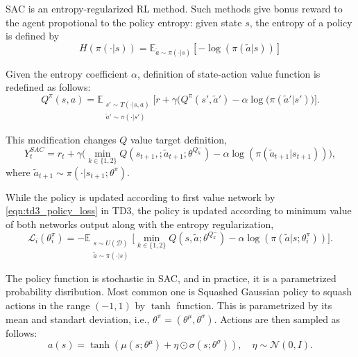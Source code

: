 \documentclass[a4paper, 12pt]{article} %
\begin{document}
SAC is an entropy-regularized RL method. Such methods give bonus reward to the agent propotional to the policy entropy: given state $s$, the entropy of a policy is defined by
\begin{equation}
\label{eqn:policy_entropy}
H(\pi(\cdot|s)) = \mathbb{E}_{\widetilde{a}\sim\pi(\cdot|s)}[-\log(\pi(\widetilde{a}|s))]
\end{equation}

Given the entropy coefficient $\alpha$, definition of state-action value function is redefined as follows: 
\begin{equation}
\label{eqn:q_dfn_entreg}
Q^{\pi}(s,a) = \mathbb{E}_{\substack{s'\sim T(\cdot|s,a)\\\widetilde{a}'\sim \pi(\cdot|s')} } \Big[r + \gamma \Big(Q^{\pi}(s',\widetilde{a}') -\alpha\log(\pi(\widetilde{a}'|s') \Big) \Big]. %
\end{equation}

This modification changes $Q$ value target definition,
\begin{equation}
\label{eqn:q_target_sac}
Y_t^{SAC} = r_t + \gamma \Big(\min_{k\in\{1,2\}} Q(s_{t+1}, ;\widetilde{a}_{t+1};\theta^{Q_k^-}) -\alpha\log(\pi(\widetilde{a}_{t+1}|s_{t+1})) \Big),
\end{equation}
where $\widetilde{a}_{t+1} \sim \pi(\cdot|s_{t+1}; \theta^{\pi})$.

While the policy is updated according to first value network by \eqref{eqn:td3_policy_loss} in TD3, the policy is updated according to minimum value of both networks output along with the entropy regularization, 
\begin{equation}
\label{eqn:sac_policy_loss}
\mathcal{L}_i(\theta^\pi_i) = - \mathbb{E}_{\substack{s \sim U(\mathcal{D})\\\widetilde{a} \sim \pi(\cdot|s)}} \Big[ \min_{k\in\{1,2\}} Q(s, \widetilde{a};\theta^{Q_k^-}) - \alpha\log(\pi(\widetilde{a}|s;\theta^\pi_i)) \Big].
\end{equation}

The policy function is stochastic in SAC, and in practice, it is a parametrized probability disribution. Most common one is 
Squashed Gaussian policy to squash actions in the range $(-1,1)$ by $\tanh$ function. 
This is parametrized by its mean and standart deviation, i.e., $\theta^{\pi}=(\theta^{\mu}, \theta^{\sigma})$. Actions are then sampled as follows: 
\begin{equation}
\label{eqn:squashed_gp_sampling}
a(s) = \tanh(\mu(s; \theta^{\mu}) + \eta \odot \sigma(s; \theta^{\sigma})), \quad \eta \sim \mathcal{N}(0, I). 
\end{equation}
\end{document}
